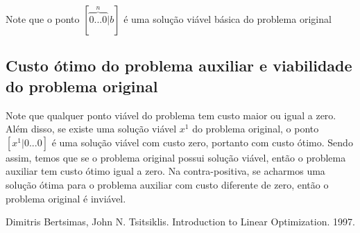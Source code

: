 \documentclass[12pt]{article}
\begin{document}
Note que o ponto $[\overbrace{0...0}^{n}|b]$ é uma solução viável básica do problema original
\subsection{Custo ótimo do problema auxiliar e viabilidade do problema original}
	Note que qualquer ponto viável do problema tem custo maior ou igual a zero. Além disso, se existe uma solução viável $x^1$ do problema original, o ponto $[x^1 | 0 ... 0]$ é uma solução viável com custo zero, portanto com custo ótimo. Sendo assim, temos que se o problema original possui solução viável, então o problema auxiliar tem custo ótimo igual a zero. Na contra-positiva, se acharmos uma solução ótima para o problema auxiliar com custo diferente de zero, então o problema original é inviável.

\newpage
\begin{thebibliography}{9}
 Dimitris Bertsimas, John N. Tsitsiklis. Introduction to Linear Optimization. 1997.
\end{thebibliography}
\end{document}
